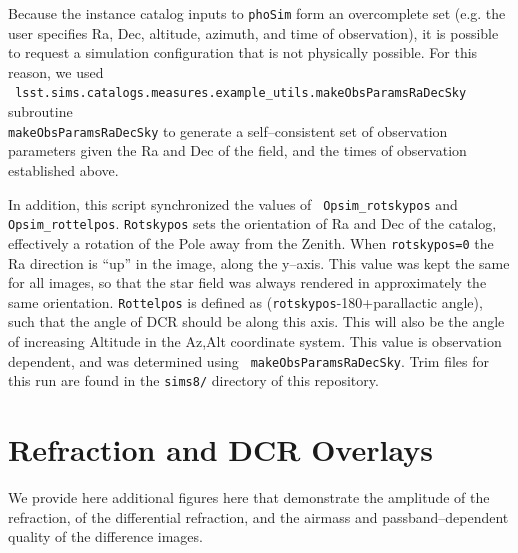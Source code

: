 \documentclass[DM,toc]{lsstdoc}
\begin{document}
Because the instance catalog inputs to {\tt phoSim} form an
overcomplete set (e.g. the user specifies Ra, Dec, altitude, azimuth,
and time of observation), it is possible to request a simulation
configuration that is not physically possible.  For this reason, we
used \\{\tt
  lsst.sims.catalogs.measures.example\_utils.makeObsParamsRaDecSky}
subroutine \\{\tt makeObsParamsRaDecSky} to generate a self--consistent
set of observation parameters given the Ra and Dec of the field, and
the times of observation established above.

In addition, this script synchronized the values of {\tt
  Opsim\_rotskypos} and {\tt Opsim\_rottelpos}.  {\tt Rotskypos} sets
the orientation of Ra and Dec of the catalog, effectively a rotation
of the Pole away from the Zenith.  When {\tt rotskypos=0} the Ra
direction is ``up'' in the image, along the y--axis.  This value was
kept the same for all images, so that the star field was always
rendered in approximately the same orientation.  {\tt Rottelpos} is
defined as ({\tt rotskypos}-180+parallactic angle), such that the
angle of DCR should be along this axis.  This will also be the angle
of increasing Altitude in the Az,Alt coordinate system.  This value is
observation dependent, and was determined using {\tt
  makeObsParamsRaDecSky}.  Trim files for this run are found in the
{\tt sims8/} directory of this repository.

\section{Refraction and DCR Overlays}

We provide here additional figures here that demonstrate the amplitude
of the refraction, of the differential refraction, and the airmass and
passband--dependent quality of the difference images.
\end{document}
